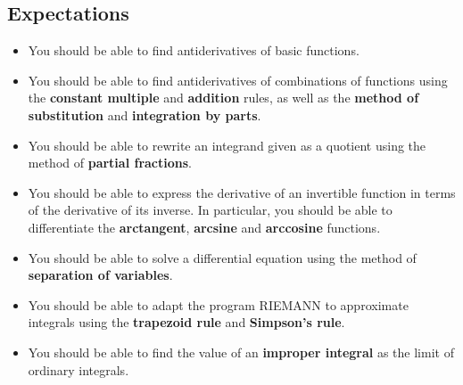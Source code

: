\subsection{Expectations}
\label{subsec:expectations}

\begin{itemize}

\item  You should be able to find antiderivatives of basic functions.

\item You should be able to find antiderivatives of combinations of
  functions using the {\bf constant multiple} and {\bf addition}
  rules, as well as the {\bf method of substitution} and {\bf
    integration by parts}.

\item You should be able to rewrite an integrand given as a quotient
  using the method of {\bf partial fractions}.

\item You should be able to express the derivative of an invertible
  function in terms of the derivative of its inverse.  In particular,
  you should be able to differentiate the {\bf arctangent}, {\bf
    arcsine} and {\bf arccosine} functions.

\item You should be able to solve a differential equation using the
  method of {\bf separation of variables}.

\item You should be able to adapt the program RIEMANN to approximate
  integrals using the {\bf trapezoid rule} and {\bf Simpson's rule}.

\item You should be able to find the value of an {\bf improper
  integral} as the limit of ordinary integrals.

\end{itemize}